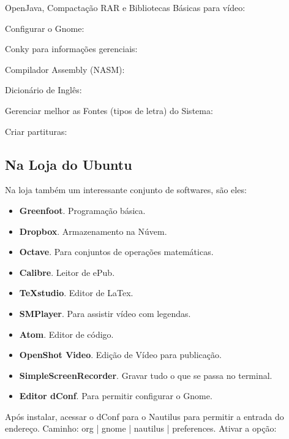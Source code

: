 \documentclass[a4paper,11pt]{article}
\begin{document}
OpenJava, Compactação RAR e Bibliotecas Básicas para vídeo: \\

Configurar o Gnome: \\

Conky para informações gerenciais: \\

Compilador Assembly (NASM): \\

Dicionário de Inglês: \\

Gerenciar melhor as Fontes (tipos de letra) do Sistema: \\

Criar partituras: \\

\subsection{Na Loja do Ubuntu}
Na loja também um interessante conjunto de softwares, são eles: \vspace{-1em}
\begin{itemize}
  \item \textbf{Greenfoot}. Programação básica.
  \item \textbf{Dropbox}. Armazenamento na Núvem.
  \item \textbf{Octave}. Para conjuntos de operações matemáticas.
  \item \textbf{Calibre}. Leitor de ePub.
  \item \textbf{TeXstudio}. Editor de LaTex.
  \item \textbf{SMPlayer}. Para assistir vídeo com legendas.
  \item \textbf{Atom}. Editor de código.
  \item \textbf{OpenShot Video}. Edição de Vídeo para publicação.
  \item \textbf{SimpleScreenRecorder}. Gravar tudo o que se passa no terminal.
  \item \textbf{Editor dConf}. Para permitir configurar o Gnome.
\end{itemize}

Após instalar, acessar o dConf para o Nautilus para permitir a entrada do endereço. Caminho: org | gnome | nautilus | preferences. Ativar a opção: 
\end{document}
